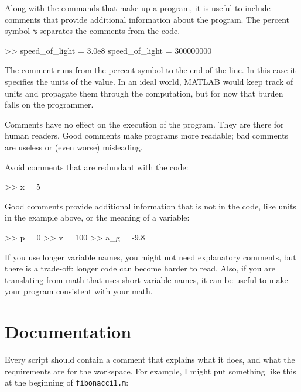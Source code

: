 \documentclass[
]{book}
\numberwithin{Answer}{chapter}
\numberwithin{Exercise}{chapter}
\begin{document}
Along with the commands that make up a program, it is useful to include comments that provide additional information about the
program.  The percent symbol {\tt \%} separates
the comments from the code.


\begin{code}
>> speed_of_light = 3.0e8     %
speed_of_light = 300000000
\end{code}

The comment runs from the percent symbol to the end of the line.
In this case it specifies the units of the value.  In an ideal world,
MATLAB would keep track of units and propagate them through the
computation, but for now that burden falls on the programmer.


Comments have no effect on the execution of the program.  They
are there for human readers.  Good comments make programs more
readable; bad comments are useless or (even worse) misleading.

Avoid comments that are redundant with the code:

\begin{code}
>> x = 5        %
\end{code}

Good comments provide additional information that is not in the
code, like units in the example above, or the meaning of a variable:

\begin{code}
>> p = 0         %
>> v = 100       %
>> a_g = -9.8    %
\end{code}

If you use longer variable names, you might not need explanatory
comments, but there is a trade-off: longer code can become harder
to read.
Also, if you are translating from math
that uses short variable names, it can be useful to make your
program consistent with your math.


\section{Documentation}

Every script should contain a comment that explains
what it does, and what the requirements are for the workspace.  For
example, I might put something like this at the beginning of
{\tt fibonacci1.m}:
\end{document}
